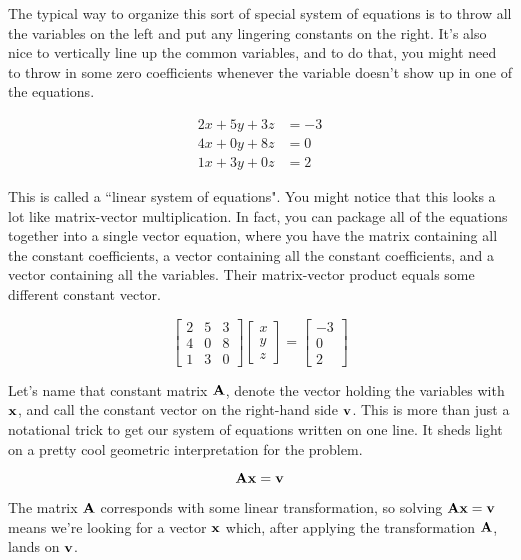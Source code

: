 The typical way to organize this sort of special system of equations is to throw
all the variables on the left and put any lingering constants on the right. It's
also nice to vertically line up the common variables, and to do that, you might
need to throw in some zero coefficients whenever the variable doesn't show up in
one of the equations.

\begin{align*}
  2x + 5y + 3z &= -3 \\
  4x + 0y + 8z &= 0 \\
  1x + 3y + 0z &= 2
\end{align*}

This is called a ``linear system of equations". You might notice that this looks
a lot like matrix-vector multiplication. In fact, you can package all of the
equations together into a single vector equation, where you have the matrix
containing all the constant coefficients, a vector containing all the constant
coefficients, and a vector containing all the variables. Their matrix-vector
product equals some different constant vector.

\begin{equation*}
  \begin{bmatrix}
    2 & 5 & 3 \\
    4 & 0 & 8 \\
    1 & 3 & 0
  \end{bmatrix}
  \begin{bmatrix}
    x \\
    y \\
    z
  \end{bmatrix} =
  \begin{bmatrix}
    -3 \\
    0 \\
    2
  \end{bmatrix}
\end{equation*}

Let's name that constant matrix $\mathbf{A}$, denote the vector holding the
variables with $\mathbf{x}$, and call the constant vector on the right-hand side
$\mathbf{v}$. This is more than just a notational trick to get our system of
equations written on one line. It sheds light on a pretty cool geometric
interpretation for the problem.

\begin{equation*}
  \mathbf{A}\mathbf{x} = \mathbf{v}
\end{equation*}

The matrix $\mathbf{A}$ corresponds with some linear transformation, so solving
$\mathbf{A}\mathbf{x} = \mathbf{v}$ means we're looking for a vector $\mathbf{x}$ which,
after applying the transformation $\mathbf{A}$, lands on $\mathbf{v}$.

